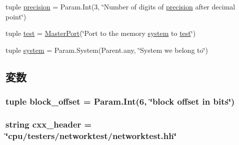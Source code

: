 \begin{DoxyCompactItemize}
\item 
tuple \hyperlink{classNetworkTest_1_1NetworkTest_a38799bf0eeacd907d8a3bd9f5c0af858}{precision} = Param.Int(3, \char`\"{}Number of digits of \hyperlink{classNetworkTest_1_1NetworkTest_a38799bf0eeacd907d8a3bd9f5c0af858}{precision} after decimal point\char`\"{})
\item 
tuple \hyperlink{classNetworkTest_1_1NetworkTest_ae2be30e6b14c541b72cb62bdb6169fab}{test} = \hyperlink{classMasterPort}{MasterPort}(\char`\"{}Port to the memory \hyperlink{classNetworkTest_1_1NetworkTest_ab737471139f5a296e5b26e8a0e1b0744}{system} to \hyperlink{classNetworkTest_1_1NetworkTest_ae2be30e6b14c541b72cb62bdb6169fab}{test}\char`\"{})
\item 
tuple \hyperlink{classNetworkTest_1_1NetworkTest_ab737471139f5a296e5b26e8a0e1b0744}{system} = Param.System(Parent.any, \char`\"{}System we belong to\char`\"{})
\end{DoxyCompactItemize}


\subsection{変数}
\hypertarget{classNetworkTest_1_1NetworkTest_a409a77a19be8842873206523fe8888e2}{
\subsubsection[{block\_\-offset}]{\setlength{\rightskip}{0pt plus 5cm}tuple {\bf block\_\-offset} = Param.Int(6, \char`\"{}block offset in bits\char`\"{})}}
\label{classNetworkTest_1_1NetworkTest_a409a77a19be8842873206523fe8888e2}
\hypertarget{classNetworkTest_1_1NetworkTest_a17da7064bc5c518791f0c891eff05fda}{
\subsubsection[{cxx\_\-header}]{\setlength{\rightskip}{0pt plus 5cm}string {\bf cxx\_\-header} = \char`\"{}cpu/testers/networktest/networktest.hh\char`\"{}}}
\label{classNetworkTest_1_1NetworkTest_a17da7064bc5c518791f0c891eff05fda}


